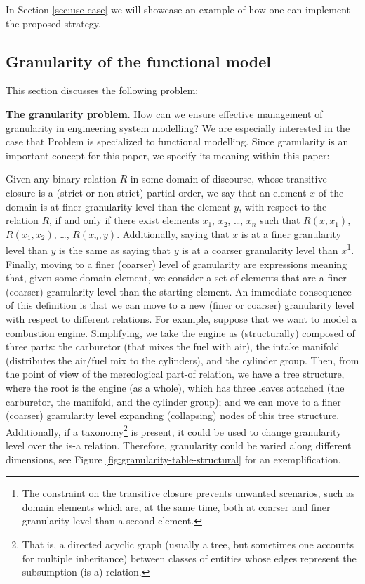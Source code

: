 \documentclass[
]{ceurart}
\begin{document}
In Section \ref{sec:use-case} we will showcase an example of how one can implement the proposed strategy.  

\subsection{Granularity of the functional model}
This section discusses the following problem:
\bflist
  \item[\mypb{granularity-problem}] \textbf{The granularity problem}. How can we ensure effective management of granularity in engineering system modelling?
\eflist
We are especially interested in the case that Problem  is specialized to functional modelling.
Since granularity is an important concept for this paper, we specify its meaning within this paper:
\bflist
\item[\mydf{granularity}]
    Given any binary relation $R$ in some domain of discourse, whose transitive closure is a (strict or non-strict) partial order, we say that an element $x$ of the domain is at finer granularity level than the element $y$, with respect to the relation $R$, if and only if there exist elements $x_1$, $x_2$, \dots, $x_n$ such that $R(x,x_1)$, $R(x_1,x_2)$, \dots, $R(x_n,y)$. 
    Additionally, saying that $x$ is at a finer granularity level than $y$ is the same as saying that $y$ is at a coarser granularity level than $x$\footnote{The constraint on the transitive closure prevents unwanted scenarios, such as domain elements which are, at the same time, both at coarser and finer granularity level than a second element.}.
    Finally, moving to a finer (coarser) level of granularity are expressions meaning that, given some domain element, we consider a set of elements that are a finer (coarser) granularity level than the starting element.%
\eflist
An immediate consequence of this definition is that we can move to a new (finer or coarser) granularity level with respect to different relations. For example, suppose that we want to model a combustion engine. Simplifying, we take the engine as (structurally) composed of three parts: the carburetor (that mixes the fuel with air), the intake manifold (distributes the air/fuel mix to the cylinders), and the cylinder group. Then, from the point of view of the mereological part-of relation, we have a tree structure, where the root is the engine (as a whole), which has three leaves attached (the carburetor, the manifold, and the cylinder group); and we can move to a finer (coarser) granularity level expanding (collapsing) nodes of this tree structure. Additionally, if a taxonomy\footnote{That is, a directed acyclic graph (usually a tree, but sometimes one accounts for multiple inheritance) between classes of entities whose edges represent the subsumption (is-a) relation.} is present, it could be used to change granularity level over the is-a relation. Therefore, granularity could be varied along different dimensions, see Figure \ref{fig:granularity-table-structural} for an exemplification. 
\end{document}
